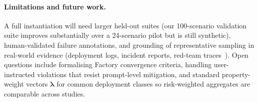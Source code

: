 \paragraph{Limitations and future work.}
A full instantiation will need larger held-out suites (our 100-scenario validation suite improves substantially over a 24-scenario pilot but is still synthetic), human-validated failure annotations, and grounding of representative sampling in real-world evidence (deployment logs, incident reports, red-team traces~\cite{ganguli2022redteaming,debenedetti2024agentdojo}). Open questions include formalising Factory convergence criteria, handling user-instructed violations that resist prompt-level mitigation, and standard property-weight vectors $\boldsymbol{\lambda}$ for common deployment classes so risk-weighted aggregates are comparable across studies.

